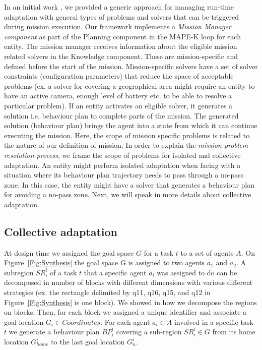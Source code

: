 \documentclass[journal]{IEEEtran}
\theoremstyle{definition}
\newcommand\darko[1]{\nb{Darko}{#1}}
\begin{document}
 

 
 
 

 
In an initial work \cite{bozhinoski2016leveraging}, we provided a generic approach for managing run-time adaptation with general types of problems and solvers that can be triggered during mission execution.
Our framework implements a \textit{Mission Manager component} as part of the Planning component in the MAPE-K loop for each entity. 
 The mission manager receives information about the eligible mission related solvers in the Knowledge component. These are mission-specific and defined before the start of the mission. Mission-specific solvers have a set of solver constraints (configuration parameters) that reduce the space of acceptable problems (ex. a solver for covering a geographical area might require an entity to have an active camera, enough level of battery etc. to be  able to resolve a particular problem).  If an entity %
 activates an eligible solver, it generates a solution i.e. behaviour plan to complete parts of the mission.
 The generated solution (behaviour plan) brings the agent into a state from which it can continue executing the mission.
 Here, the scope of mission specific problems is related to the nature of our definition of mission. In order to explain the \textit{mission problem resolution process}, we frame the scope of problems for isolated and collective adaptation.
 An entity might perform isolated adaptation when facing with a situation where its behaviour plan trajectory needs to pass through a no-pass zone. In this case, the entity might have a solver that generates a behaviour plan for avoiding a no-pass zone. Next, we will speak in more details about collective adaptation.

\subsection{Collective adaptation}
At design time we assigned the goal space $G$ for a task $t$ to a set of agents $A$. On Figure~\ref{Fig:Synthesis} the goal space G is assigned to two agents $a_1$ and $a_2$. A subregion $SR^t_i$ of a task $t$ that a specific agent $a_i$  was assigned to do can be decomposed in number of blocks with different dimensions with various different strategies (ex. the rectangle delimited by q11, q16, q15, and q12 in Figure~\ref{Fig:Synthesis} is one block). We showed in \cite{bozhinoski2015flyaq, di2013engineering} how we decompose the regions on blocks.  
Then, for each block we assigned a unique identifier and associate a goal location $G_i \in Coordinates$. 
For each agent $a_i \in A$ involved in a specific task $t$ we generate a  behaviour plan $BP^t_i$ covering a sub-region $SR^t_i \in G$ from its home location $G^i_{home}$ to the last goal location $G^i_n$. 
\end{document}
